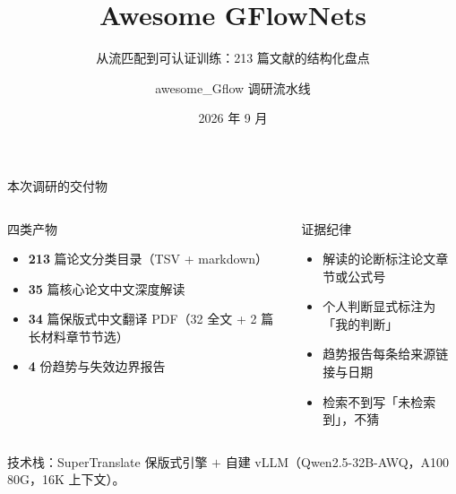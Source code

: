 \documentclass[aspectratio=169,10pt]{beamer}
\title[Awesome GFlowNets]{Awesome GFlowNets}
\subtitle{从流匹配到可认证训练：213 篇文献的结构化盘点}
\author{awesome\_Gflow 调研流水线}
\institute{检索截止 2026-08-25}
\date{2026 年 9 月}
\begin{document}
\begin{frame}
  \titlepage
\end{frame}

\begin{frame}{本次调研的交付物}
  \begin{columns}[T]
      \begin{block}{四类产物}
        \begin{itemize}
          \item \textbf{213} 篇论文分类目录（TSV + markdown）
          \item \textbf{35} 篇核心论文中文深度解读
          \item \textbf{34} 篇保版式中文翻译 PDF（32 全文 + 2 篇长材料章节节选）
          \item \textbf{4} 份趋势与失效边界报告
        \end{itemize}
      \end{block}
      \begin{block}{证据纪律}
        \begin{itemize}
          \item 解读的论断标注论文章节或公式号
          \item 个人判断显式标注为「我的判断」
          \item 趋势报告每条给来源链接与日期
          \item 检索不到写「未检索到」，不猜
        \end{itemize}
      \end{block}
  \end{columns}
  \vspace{6pt}
  技术栈：SuperTranslate 保版式引擎 $+$ 自建 vLLM（Qwen2.5-32B-AWQ，A100 80G，16K 上下文）。
\end{frame}
\end{document}
